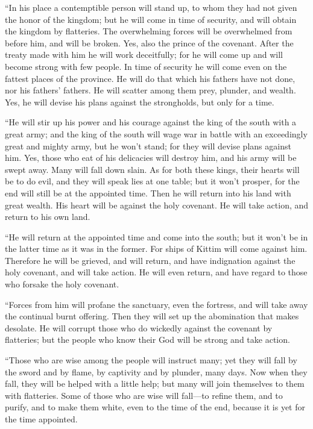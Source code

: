 \myverse{}“In his place a contemptible person will stand up, to whom they
had not given the honor of the kingdom; but he will come in time of security, and will obtain the kingdom
by flatteries.
\myverse{}The overwhelming forces will be overwhelmed from before him, and will be
broken. Yes, also the prince of the covenant.
\myverse{}After the treaty made with him he will work deceitfully; for he will come
up and will become strong with few people.
\myverse{}In time of security he will come even on the fattest places of the province.
He will do that which his fathers have not done, nor his fathers’ fathers. He will scatter among them
prey, plunder, and wealth. Yes, he will devise his plans against the strongholds, but only for a time.

\myverse{}“He will stir up his power and his courage against the king
of the south with a great army; and the king of the south will wage war in battle with an exceedingly
great and mighty army, but he won’t stand; for they will devise plans against him.
\myverse{}Yes, those who eat of his delicacies will destroy him, and his army will
be swept away. Many will fall down slain.
\myverse{}As for both these kings, their hearts will be to do evil, and they will speak
lies at one table; but it won’t prosper, for the end will still be at the appointed time.
\myverse{}Then he will return into his land with great wealth. His heart will be against
the holy covenant. He will take action, and return to his own land.

\myverse{}“He will return at the appointed time and come into the south;
but it won’t be in the latter time as it was in the former.
\myverse{}For ships of Kittim will come against him. Therefore he will be grieved,
and will return, and have indignation against the holy covenant, and will take action. He will even return,
and have regard to those who forsake the holy covenant.

\myverse{}“Forces from him will profane the sanctuary, even the fortress,
and will take away the continual burnt offering. Then they will set up the abomination that makes desolate.
\myverse{}He will corrupt those who do wickedly against the covenant by flatteries;
but the people who know their God will be strong and take action.

\myverse{}“Those who are wise among the people will instruct many; yet
they will fall by the sword and by flame, by captivity and by plunder, many days.
\myverse{}Now when they fall, they will be helped with a little help; but many will
join themselves to them with flatteries.
\myverse{}Some of those who are wise will fall—to refine them, and to purify, and to
make them white, even to the time of the end, because it is yet for the time appointed.

